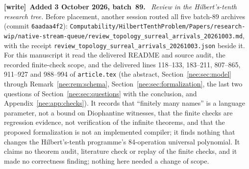 \documentclass[11pt,letterpaper]{article}
\numberwithin{equation}{section}
\theoremstyle{plain}
\theoremstyle{definition}
\theoremstyle{remark}
\newenvironment{writenote}[1][]{\par\smallskip\begingroup\small\raggedright
 \setlength{\parindent}{1.25em}\noindent\textbf{[write]}\if\relax\detokenize{#1}\relax\else~\textbf{#1.}\fi\ }%
 {\par\endgroup\smallskip}
\begin{document}
\begin{writenote}[Added 3 October 2026, batch~89]
\emph{Review in the Hilbert's-tenth research tree.} Before placement, another session routed all five batch-89 archives (commit \texttt{6aadaa4f2}): \nolinkurl{Computability/HilbertTenthProblem/Papers/research-wip/native-stream-queue/review_topology_surreal_arrivals_20261003.md}, with the receipt \nolinkurl{review_topology_surreal_arrivals_20261003.json} beside it. For this manuscript it read the delivered README and source audit, the recorded finite-check scope, and the delivered lines 118--133, 183--211, 807--865, 911--927 and 988--994 of \texttt{article.tex} (the abstract, Section~\ref{nee:sec:model} through Remark~\ref{nee:rem:schema}, Section~\ref{nee:sec:formalization}, the last two questions of Section~\ref{nee:sec:questions} with the conclusion, and Appendix~\ref{nee:app:checks}). It records that ``finitely many names'' is a language parameter, not a bound on Diophantine witnesses, that the finite checks are regression evidence, not verification of the infinite theorems, and that the proposed formalization is not an implemented compiler; it finds nothing that changes the Hilbert's-tenth programme's 84-operation universal polynomial. It claims no theorem audit, literature check or replay of the finite checks, and it made no correctness finding; nothing here needed a change of scope.


\end{writenote}
\end{document}
